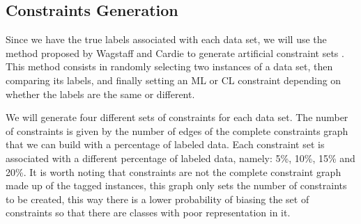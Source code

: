 \documentclass[review]{elsarticle}
\begin{document}
\subsection{Constraints Generation}

Since we have the true labels associated with each data set, we will use the method proposed by Wagstaff and Cardie to generate artificial constraint sets \cite{wagstaff2001constrained}. This method consists in randomly selecting two instances of a data set, then comparing its labels, and finally setting an ML or CL constraint depending on whether the labels are the same or different.

We will generate four different sets of constraints for each data set. The number of constraints is given by the number of edges of the complete constraints graph that we can build with a percentage of labeled data. Each constraint set is associated with a different percentage of labeled data, namely: 5\%, 10\%, 15\% and 20\%. It is worth noting that constraints are not the complete constraint graph made up of the tagged instances, this graph only sets the number of constraints to be created, this way there is a lower probability of biasing the set of constraints so that there are classes with poor representation in it.
\end{document}
